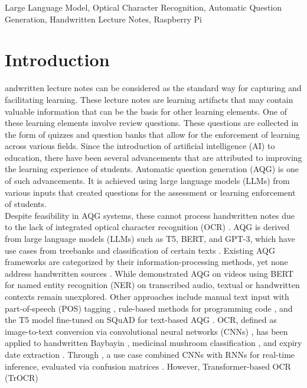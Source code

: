 \documentclass[conference]{IEEEtran}
\begin{document}
\begin{IEEEkeywords}
Large Language Model, Optical Character Recognition,
Automatic Question Generation, Handwritten Lecture Notes, Raspberry Pi
\end{IEEEkeywords}

\section{Introduction}
andwritten lecture notes can be considered as the standard way 
for capturing and facilitating learning. These lecture notes are 
learning artifacts that may contain valuable information that can 
be the basis for other learning elements. One of these learning elements 
involve review questions. These questions are collected in the 
form of quizzes and question banks that allow for the enforcement of 
learning across various fields. Since the introduction of artificial 
intelligence (AI) to education, there have been several advancements 
that are attributed to improving the learning experience of students. 
Automatic question generation (AQG) is one of such advancements. 
It is achieved using large language models (LLMs) from various inputs 
that created questions for the assessment or learning enforcement of 
students.
\\
\indent Despite feasibility in AQG systems, 
these cannot process handwritten notes 
due to the lack of integrated optical character recognition (OCR) 
\cite{Arbaaeen2020}. AQG is derived from large language models (LLMs) 
such as T5, BERT, and GPT-3, which have use cases from 
treebanks \cite{Mesina2020} and classification of certain texts \cite{Padilla2020} \cite{Mingua2021} \cite{Fernandez2023}.
Existing AQG frameworks are categorized by 
their information-processing methods, yet none address 
handwritten sources \cite{Arbaaeen2020}. While \cite{Ou2022} demonstrated AQG 
on videos using BERT for named entity recognition (NER) on 
transcribed audio, textual or handwritten contexts remain 
unexplored. Other approaches include manual text input 
with part-of-speech (POS) tagging \cite{Moron2021}, rule-based methods 
for programming code \cite{Gaur2023}, and the T5 model 
fine-tuned on SQuAD for text-based AQG \cite{Tsai2021}. OCR, defined as 
image-to-text conversion via convolutional neural networks (CNNs) \cite{Ligsay2022}, has been applied to handwritten Baybayin \cite{Ligsay2022}, medicinal mushroom classification \cite{Sutayco2024}, and expiry date extraction \cite{Manlises2024}. Through \cite{Calimag2023}, a use case combined CNNs with RNNs for real-time inference, evaluated via confusion matrices \cite{Ishikawa2020} \cite{Villaverde2023}. However, Transformer-based OCR (TrOCR) 
\end{document}
